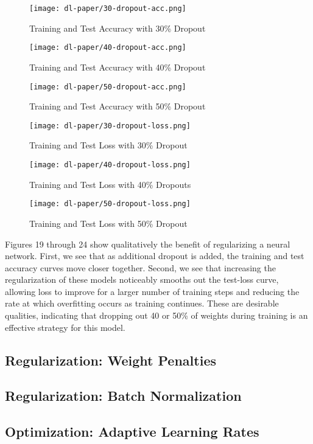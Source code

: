 \documentclass[12pt]{article}  %
\theoremstyle{definition}
\theoremstyle{remark}
\begin{document}
\begin{figure}[!htb]
  \texttt{[image: dl-paper/30-dropout-acc.png]}
  \caption{Training and Test Accuracy with 30\% Dropout}\label{30-drop}
\endminipage\hfill
{}
  \texttt{[image: dl-paper/40-dropout-acc.png]}
  \caption{Training and Test Accuracy with 40\% Dropout}\label{40-drop}
\endminipage\hfill
{}%
  \texttt{[image: dl-paper/50-dropout-acc.png]}
  \caption{Training and Test Accuracy with 50\% Dropout}\label{50-drop}
\endminipage
\end{figure}


\begin{figure}[!htb]
  \texttt{[image: dl-paper/30-dropout-loss.png]}
  \caption{Training and Test Loss with 30\% Dropout}\label{30-drop-loss}
\endminipage\hfill
{}
  \texttt{[image: dl-paper/40-dropout-loss.png]}
  \caption{Training and Test Loss with 40\% Dropouts}\label{40-drop-loss}
\endminipage\hfill
{}%
  \texttt{[image: dl-paper/50-dropout-loss.png]}
  \caption{Training and Test Loss with 50\% Dropout}\label{50-drop-loss}
\endminipage
\end{figure}

\par Figures 19 through 24 show qualitatively the benefit of regularizing a neural network. First, we see that as additional dropout is added, the training and test accuracy curves move closer together. Second, we see that increasing the regularization of these models noticeably smooths out the test-loss curve, allowing loss to improve for a larger number of training steps and reducing the rate at which overfitting occurs as training continues. These are desirable qualities, indicating that dropping out 40 or 50\% of weights during training is an effective strategy for this model. 

\subsection{Regularization: Weight Penalties}
\subsection{Regularization: Batch Normalization}
\subsection{Optimization: Adaptive Learning Rates}
\end{document}
